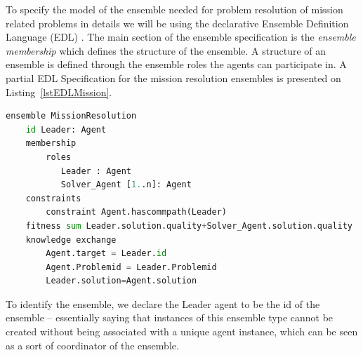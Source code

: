 \documentclass[journal]{IEEEtran}
\theoremstyle{definition}
\newcommand\patrizio[1]{\nb{Patrizio}{#1}}
\begin{document}
 

 
 
 


To specify the model of the ensemble needed for problem resolution of mission related problems in details we will be  using the declarative Ensemble
Definition Language (EDL) \cite{bures2015towards}.
The main section of the ensemble specification is
the \textit{ensemble membership} which defines the
structure of the ensemble.
A structure of an ensemble is defined through the ensemble
roles the agents can participate in. A partial EDL Specification for the mission resolution ensembles is presented on Listing~\ref{lstEDLMission}.
\begin{lstlisting}[caption=EDL Specification for mission resolution ensembles, language=Python, label=lstEDLMission]
ensemble MissionResolution
    id Leader: Agent
    membership
        roles
           Leader : Agent
           Solver_Agent [1..n]: Agent
    constraints
        constraint Agent.hascommpath(Leader)
    fitness sum Leader.solution.quality+Solver_Agent.solution.quality
    knowledge exchange
        Agent.target = Leader.id
        Agent.Problemid = Leader.Problemid
        Leader.solution=Agent.solution
\end{lstlisting}



To identify the ensemble, we declare the Leader agent to be the id of the ensemble – essentially
saying that instances of this ensemble type cannot be
created without being associated with a unique agent
instance, which can be seen as a sort of coordinator
of the ensemble.
\end{document}
